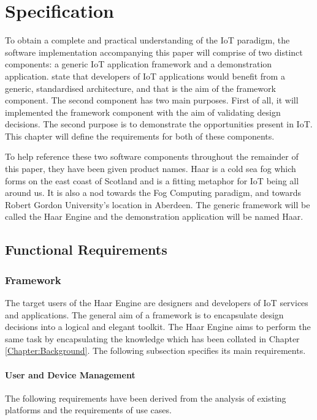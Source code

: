 \chapter{Specification}
\label{Chapter:Specification}
  To obtain a complete and practical understanding of the IoT paradigm, the software implementation accompanying this paper will comprise of two distinct components: a generic IoT application framework and a demonstration application. \citet{interoperability:2015} state that developers of IoT applications would benefit from a generic, standardised architecture, and that is the aim of the framework component. The second component has two main purposes. First of all, it will implemented the framework component with the aim of validating design decisions. The second purpose is to demonstrate the opportunities present in IoT. This chapter will define the requirements for both of these components.

  To help reference these two software components throughout the remainder of this paper, they have been given product names. Haar is a cold sea fog which forms on the east coast of Scotland and is a fitting metaphor for IoT being all around us. It is also a nod towards the Fog Computing paradigm, and towards Robert Gordon University's location in Aberdeen. The generic framework will be called the Haar Engine and the demonstration application will be named Haar.

  \section{Functional Requirements}
    \subsection{Framework}
      The target users of the Haar Engine are designers and developers of IoT services and applications. The general aim of a framework is to encapsulate design decisions into a logical and elegant toolkit. The Haar Engine aims to perform the same task by encapsulating the knowledge which has been collated in Chapter \ref{Chapter:Background}. The following subsection specifies its main requirements.

      \subsubsection{User and Device Management}
        The following requirements have been derived from the analysis of existing platforms and the requirements of use cases.


